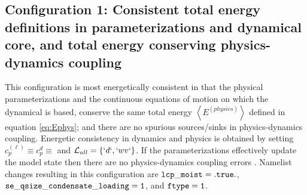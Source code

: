 \documentclass{agujournal}
\begin{document}
\subsection{Configuration 1: Consistent total energy definitions in parameterizations and dynamical core, and total energy conserving physics-dynamics coupling}
This configuration is most energetically consistent in that the physical parameterizations and the continuous equations of motion on which the dynamical is based, conserve the same total energy $\left< E^{(physics)}\right>$ defined in equation \eqref{eq:Ephys}; and there are no spurious sources/sinks in physics-dynamics coupling. Energetic consistency in dynamics and physics is obtained by setting $c_p^{(\ell)}\equiv c_p^{d}\equiv$ and $\mathcal{L}_{all}=\left\{ `d`,`wv`\right\}$. If the parameterizations effectively update the model state then there are no physics-dynamics coupling errors \citep[$\tt{ftype=1}$ setup described in detail in ][]{LetAl2018JAMES}. Namelist changes resulting in this configuration are $\tt{lcp\_moist}=.true.$, $\tt{se\_qsize\_condensate\_loading=1}$, and $\tt{ftype=1}$.
\end{document}
